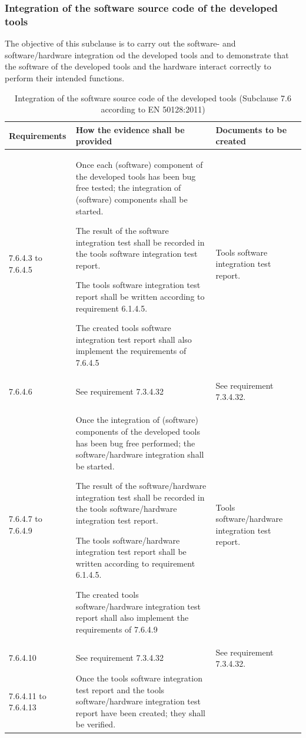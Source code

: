 \documentclass{template/openetcs_report}
\begin{document}
\subsubsection{Integration of the software source code of the developed tools}
\begin{flushleft}
The objective of this subclause is to carry out the software- and software/hardware integration od the developed tools and to demonstrate that the software of the developed tools and the hardware interact correctly to perform their intended functions.
\end{flushleft}
{\footnotesize\sffamily\centering
\begin{longtable}{|p{2cm}|p{9cm}|p{3cm}|}
\caption{Integration of the software source code of the developed tools (Subclause 7.6 according to EN 50128:2011)}\\
\hline
\bfseries Requirements & \bfseries How the evidence shall be provided & \bfseries Documents to be created\\
\hline
\hline
\endhead
\hline
\endfoot

7.6.4.3 to 7.6.4.5 & Once each (software) component of the developed tools has been bug free tested; the integration of (software) components shall be started.

The result of the software integration test shall be recorded in the tools software integration test report.

The tools software integration test report shall be written according to requirement 6.1.4.5.

The created tools software integration test report shall also implement the requirements of 7.6.4.5
& Tools software integration test report.\\ 
\hline
7.6.4.6 & See requirement 7.3.4.32 & See requirement 7.3.4.32.\\ 
\hline
7.6.4.7 to 7.6.4.9 & Once the integration of (software) components of the developed tools has been bug free performed; the software/hardware integration shall be started.

The result of the software/hardware integration test shall be recorded in the tools software/hardware integration test report.

The tools software/hardware integration test report shall be written according to requirement 6.1.4.5.

The created tools software/hardware integration test report shall also implement the requirements of 7.6.4.9
& Tools software/hardware integration test report.\\ 
\hline
7.6.4.10 & See requirement 7.3.4.32 & See requirement 7.3.4.32.\\ 
\hline
7.6.4.11 to 7.6.4.13 & Once the tools software integration test report and the tools software/hardware integration test report have been created; they shall be verified.


\end{longtable}}
\end{document}
